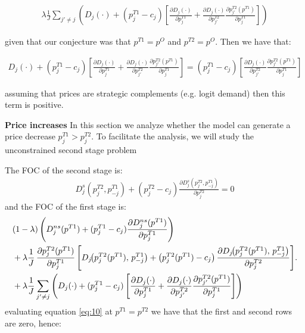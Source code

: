 \documentclass[12pt]{article}
\begin{document}
\begin{align}
    \lambda \frac{1}{J} \sum_{j'\neq j} \left(D_j(\cdot) + (p_j^{T1} - c_j) \left[ \frac{\partial D_j(\cdot)}{\partial p_j^{T1}} + \frac{\partial D_j(\cdot)}{\partial p_{j'}^{T2}} \frac{\partial p_{j'}^{T2}(p^{T1})}{\partial p_j^{T1}}\right]\right)  
\end{align}

given that our conjecture was that $p^{T1} = p^O$ and $p^{T2} = p^O$. Then we have that: 

\begin{align*}
    D_j(\cdot) + (p_j^{T1} - c_j) \left[ \frac{\partial D_j(\cdot)}{\partial p_j^{T1}} + \frac{\partial D_j(\cdot)}{\partial p_{j'}^{T2}} \frac{\partial p_{j'}^{T2}(p^{T1})}{\partial p_j^{T1}}\right]  = 
    (p_j^{T1} - c_j) \left[ \frac{\partial D_j(\cdot)}{\partial p_{j'}^{T2}} \frac{\partial p_{j'}^{T2}(p^{T1})}{\partial p_j^{T1}}\right] 
\end{align*}

assuming that prices are strategic complements (e.g. logit demand) then this term is positive. 


\textbf{Price increases}
In this section we analyze whether the model can generate a price  decrease $p_j^{T1} > p_j^{T2}$. To facilitate the analysis, we will study the unconstrained second stage problem


The FOC of the second stage is: 
\begin{align}
    D_j^s(p_j^{T2}, p_{-j}^{T1}) + (p_j^{T2} - c_j) \frac{\partial D_j^s(p_j^{T2}, p_{-j}^{T1})}{\partial p_j^{T2}} = 0 
\end{align}
and the FOC of the first stage is: 
\begin{align}\label{eq:10}
  &(1-\lambda) \left( D_j^{ns}(p^{T1}) + (p_j^{T1} - c_j) \frac{\partial D_j^{ns}(p^{T1})}{\partial p_j^{T1}} \right) \notag  \\ 
    & + \lambda \frac{1}{J}\,\frac{\partial p_j^{T2}(p^{T1})}{\partial p_j^{T1}}\,
    \Bigg[ D_j\!\big(p_j^{T2}(p^{T1}),\, p_{-j}^{T1}\big)
    + \big(p_j^{T2}(p^{T1}) - c_j\big)\,
    \frac{\partial D_j\!\big(p_j^{T2}(p^{T1}),\, p_{-j}^{T1}\big)}{\partial p_j^{T2}} \Bigg]. \notag \\
    & + \lambda \frac{1}{J} \sum_{j'\neq j} \left(D_j(\cdot) + (p_j^{T1} - c_j) \left[ \frac{\partial D_j(\cdot)}{\partial p_j^{T1}} + \frac{\partial D_j(\cdot)}{\partial p_{j'}^{T2}} \frac{\partial p_{j'}^{T2}(p^{T1})}{\partial p_j^{T1}}\right]\right)  
\end{align}
evaluating equation \ref{eq:10} at $p^{T1} = p^{T2}$ we have that the first and second rows are zero, hence: 
\end{document}
